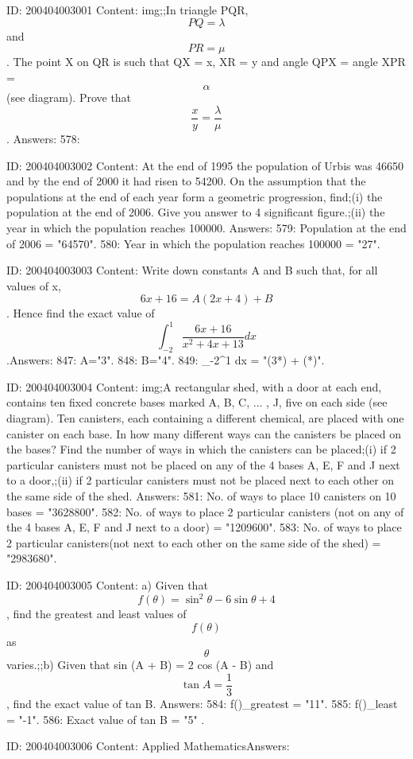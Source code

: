 \documentclass{article}
\begin{document}
ID: 200404003001
Content:
img;;In triangle PQR,  $$PQ = \lambda $$ and  $$PR = \mu $$. The point X on QR is such that QX = x, XR = y and angle QPX = angle XPR =  $$\alpha $$ (see diagram). Prove that  $$\frac{x}{y} = \frac{\lambda}{\mu}$$. Answers:
578: 

ID: 200404003002
Content:
At the end of 1995 the population of Urbis was 46650 and by the end of 2000 it had risen to 54200. On the assumption that the populations at the end of each year form a geometric progression, find;(i) the population at the end of 2006. Give you answer to 4 significant figure.;(ii) the year in which the population reaches 100000. Answers:
579: Population at the end of 2006 = "64570".
580: Year in which the population reaches 100000 = "27".

ID: 200404003003
Content:
Write down constants A and B such that, for all values of x, $$6x + 16 = A (2x + 4) + B$$. Hence find the exact value of  $$\int_{-2}^{1} \frac{6x + 16}{x^2  + 4x + 13} dx $$.Answers:
847: A="3".
848: B="4".
849: \int_{-2}^{1}  dx = "(3*) + (*\pi)".

ID: 200404003004
Content:
img;A rectangular shed, with a door at each end, contains ten fixed concrete bases marked A, B, C, ... , J, five on each side (see diagram). Ten canisters, each containing a different chemical, are placed with one canister on   each base. In how many different ways can the canisters be placed on the bases? Find the number of ways in which the canisters can be placed;(i) if 2 particular canisters must not be placed on any of the 4 bases A, E, F and J next to a door,;(ii) if 2 particular canisters must not be placed next to each other on the same side of the shed. Answers:
581: No. of ways to place 10 canisters on 10 bases = "3628800".
582: No. of ways to place 2 particular canisters (not on any of the 4 bases A, E, F and J next to a door) = "1209600".
583: No. of ways to place 2 particular canisters(not next to each other on the same side of the shed) = "2983680".

ID: 200404003005
Content:
a) Given that  $$f( \theta  ) = \sin ^2 \theta  - 6\sin \theta  + 4$$, find the greatest and least values of  $$f( \theta  )$$ as  $$\theta $$ varies.;;b) Given that sin (A + B) = 2 cos (A - B) and  $$\tan A = \frac{1}{3}$$, find the exact value of tan B. Answers:
584: f(\theta)_{greatest} = "11".
585: f(\theta)_{least} = "-1".
586: Exact value of tan B = "5" .

ID: 200404003006
Content:
Applied MathematicsAnswers:
\end{document}
